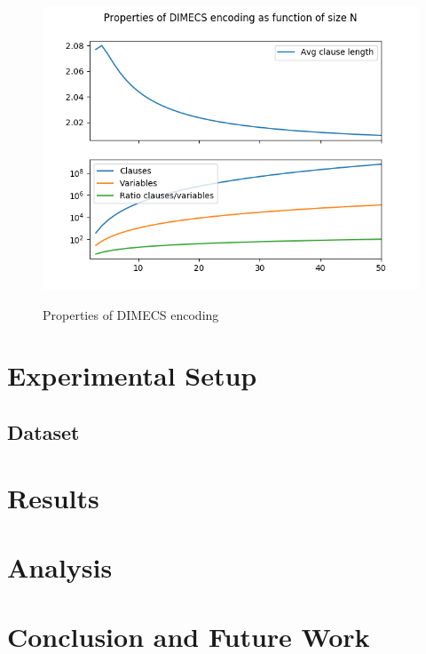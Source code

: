 \documentclass{article}
\begin{document}
\begin{figure}
  \centering
  \includegraphics[width=.9\textwidth]{dimecs_props}
  \label{fig_dimecs_props}
  \caption{Properties of DIMECS encoding}
\end{figure}

\section{Experimental Setup}

\subsection{Dataset}

\section{Results}

\section{Analysis}


\section{Conclusion and Future Work}


\printbibliography
\end{document}
